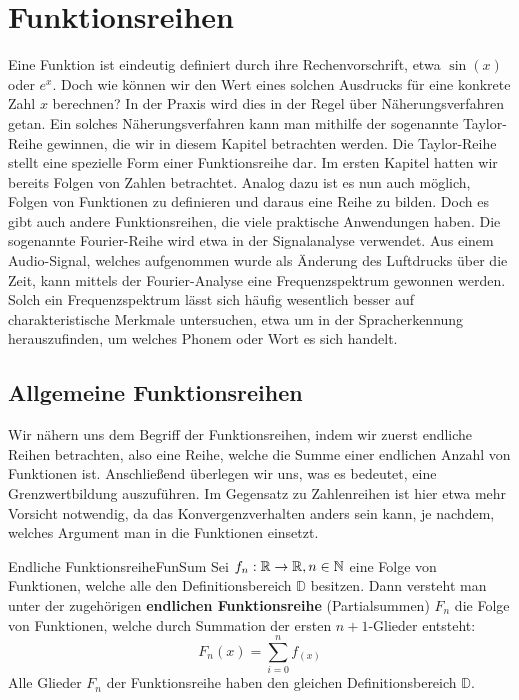 \chapter{Funktionsreihen}

Eine Funktion ist eindeutig definiert durch ihre Rechenvorschrift, etwa $\sin(x)$ oder $e^x$. Doch wie können wir den Wert eines solchen Ausdrucks für eine konkrete Zahl $x$ berechnen? In der Praxis wird dies in der Regel über Näherungsverfahren getan. Ein solches Näherungsverfahren kann man mithilfe der sogenannte Taylor-Reihe gewinnen, die wir in diesem Kapitel betrachten werden. Die Taylor-Reihe stellt eine spezielle Form einer Funktionsreihe dar. Im ersten Kapitel hatten wir bereits Folgen von Zahlen betrachtet. Analog dazu ist es nun auch möglich, Folgen von Funktionen zu definieren und daraus eine Reihe zu bilden. Doch es gibt auch andere Funktionsreihen, die viele praktische Anwendungen haben. Die sogenannte Fourier-Reihe wird etwa in der Signalanalyse verwendet. Aus einem Audio-Signal, welches aufgenommen wurde als Änderung des Luftdrucks über die Zeit, kann mittels der Fourier-Analyse eine Frequenzspektrum gewonnen werden. Solch ein Frequenzspektrum lässt sich häufig wesentlich besser auf charakteristische Merkmale untersuchen, etwa um in der Spracherkennung herauszufinden, um welches Phonem oder Wort es sich handelt.

\section{Allgemeine Funktionsreihen}

Wir nähern uns dem Begriff der Funktionsreihen, indem wir zuerst endliche Reihen betrachten, also eine Reihe, welche die Summe einer endlichen Anzahl von Funktionen ist. Anschließend überlegen wir uns, was es bedeutet, eine Grenzwertbildung auszuführen. Im Gegensatz zu Zahlenreihen ist hier etwa mehr Vorsicht notwendig, da das Konvergenzverhalten anders sein kann, je nachdem, welches Argument man in die Funktionen einsetzt.

\begin{definition}{Endliche Funktionsreihe}{FunSum}
    Sei $f_n: \mathbb{R} \to \mathbb{R}, n\in\mathbb{N}$  eine Folge von Funktionen, welche alle den Definitionsbereich $\mathbb{D}$ besitzen. Dann versteht man unter der zugehörigen \textbf{endlichen Funktionsreihe} (Partialsummen) $F_n$ die Folge von Funktionen, welche durch Summation der ersten $n+1$-Glieder entsteht:
    $$
        F_n(x) = \sum\limits_{i=0}^n f_(x)
    $$
    Alle Glieder $F_n$ der Funktionsreihe haben den gleichen Definitionsbereich $\mathbb{D}$.
\end{definition}

